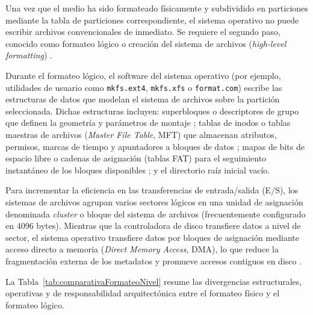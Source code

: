 \documentclass[12pt]{article}
\begin{document}
Una vez que el medio ha sido formateado físicamente y subdividido en particiones mediante la tabla de particiones correspondiente, el sistema operativo no puede escribir archivos convencionales de inmediato. Se requiere el segundo paso, conocido como formateo lógico o creación del sistema de archivos (\textit{high-level formatting}) \parencite[\S 12.5.1, p.\ 418]{silberschatz2006fundamentos}.

Durante el formateo lógico, el software del sistema operativo (por ejemplo, utilidades de usuario como \texttt{mkfs.ext4}, \texttt{mkfs.xfs} o \texttt{format.com}) escribe las estructuras de datos que modelan el sistema de archivos sobre la partición seleccionada. Dichas estructuras incluyen: superbloques o descriptores de grupo que definen la geometría y parámetros de montaje \parencite[\S 8.2, pp.\ 448--450]{carretero2001sistemas}; tablas de inodos o tablas maestras de archivos (\textit{Master File Table}, MFT) que almacenan atributos, permisos, marcas de tiempo y apuntadores a bloques de datos \parencite[\S 11.1, p.\ 369]{silberschatz2006fundamentos}; mapas de bits de espacio libre o cadenas de asignación (tablas FAT) para el seguimiento instantáneo de los bloques disponibles \parencite[\S 11.5, pp.\ 524--526]{stallings2018operating}; y el directorio raíz inicial vacío.

Para incrementar la eficiencia en las transferencias de entrada/salida (E/S), los sistemas de archivos agrupan varios sectores lógicos en una unidad de asignación denominada \textit{cluster} o bloque del sistema de archivos (frecuentemente configurado en 4096 bytes). Mientras que la controladora de disco transfiere datos a nivel de sector, el sistema operativo transfiere datos por bloques de asignación mediante acceso directo a memoria (\textit{Direct Memory Access}, DMA), lo que reduce la fragmentación externa de los metadatos y promueve accesos contiguos en disco \parencite[\S 12.5.1, p.\ 419]{silberschatz2006fundamentos}.

La Tabla~\ref{tab:comparativaFormateoNivel} resume las divergencias estructurales, operativas y de responsabilidad arquitectónica entre el formateo físico y el formateo lógico.
\end{document}
